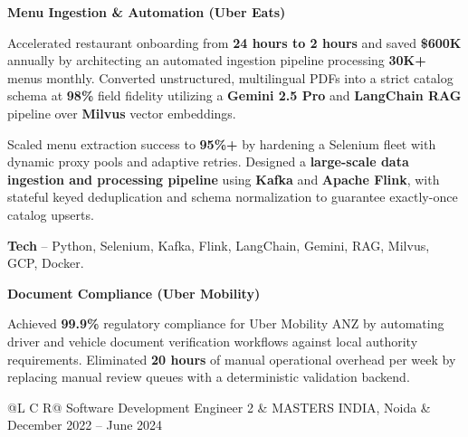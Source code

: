 \textcolor{Project}{\textbf{Menu Ingestion \& Automation (Uber Eats)}}
\vspace{-0.88ex}
\begin{zitemize}
    \item Accelerated restaurant onboarding from \textbf{24 hours to 2 hours} and saved \textbf{\$600K} annually by architecting an automated ingestion pipeline processing \textbf{30K+} menus monthly. Converted unstructured, multilingual PDFs into a strict catalog schema at \textbf{98\%} field fidelity utilizing a \textbf{Gemini 2.5 Pro} and \textbf{LangChain RAG} pipeline over \textbf{Milvus} vector embeddings.
    \item Scaled menu extraction success to \textbf{95\%+} by hardening a Selenium fleet with dynamic proxy pools and adaptive retries. Designed a \textbf{large-scale data ingestion and processing pipeline} using \textbf{Kafka} and \textbf{Apache Flink}, with stateful keyed deduplication and schema normalization to guarantee exactly-once catalog upserts.
    \item \textbf{Tech} -- Python, Selenium, Kafka, Flink, LangChain, Gemini, RAG, Milvus, GCP, Docker.
\end{zitemize}

\textcolor{Project}{\textbf{Document Compliance (Uber Mobility)}}
\vspace{-0.88ex}
\begin{zitemize}
    \item Achieved \textbf{99.9\%} regulatory compliance for Uber Mobility ANZ by automating driver and vehicle document verification workflows against local authority requirements. Eliminated \textbf{20 hours} of manual operational overhead per week by replacing manual review queues with a deterministic validation backend.
\end{zitemize}

\noindent
\begin{tabularx}{\textwidth}{@{}L C R@{}}
\textcolor{role}{Software Development Engineer 2} & \textcolor{company}{MASTERS INDIA, Noida} & \textcolor{date}{December 2022 -- June 2024}\\
\end{tabularx}
\vspace{-1.6ex}

